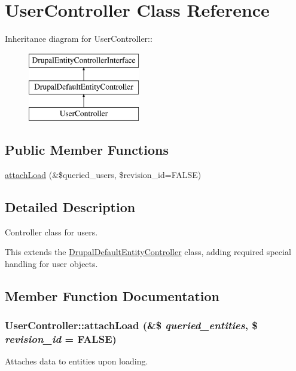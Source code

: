 \hypertarget{classUserController}{
\section{UserController Class Reference}
\label{classUserController}
}
Inheritance diagram for UserController::\begin{figure}[H]
\begin{center}
\leavevmode
\includegraphics[height=3cm]{classUserController}
\end{center}
\end{figure}
\subsection*{Public Member Functions}
\begin{DoxyCompactItemize}
\item 
\hyperlink{classUserController_a3be247594b3793977c74fc29241502ec}{attachLoad} (\&\$queried\_\-users, \$revision\_\-id=FALSE)
\end{DoxyCompactItemize}


\subsection{Detailed Description}
Controller class for users.

This extends the \hyperlink{classDrupalDefaultEntityController}{DrupalDefaultEntityController} class, adding required special handling for user objects. 

\subsection{Member Function Documentation}
\hypertarget{classUserController_a3be247594b3793977c74fc29241502ec}{
\subsubsection[{attachLoad}]{\setlength{\rightskip}{0pt plus 5cm}UserController::attachLoad (\&\$ {\em queried\_\-entities}, \/  \$ {\em revision\_\-id} = {\ttfamily FALSE})}}
\label{classUserController_a3be247594b3793977c74fc29241502ec}
Attaches data to entities upon loading.

